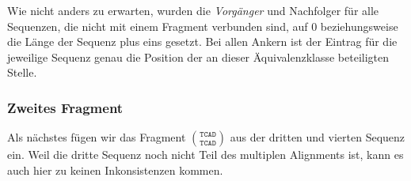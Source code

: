 Wie nicht anders zu erwarten, wurden die \emph{Vorgänger} und Nachfolger für alle Sequenzen, die nicht mit einem Fragment verbunden sind, auf 0 beziehungsweise die Länge der Sequenz plus eins gesetzt. Bei allen Ankern ist der Eintrag für die jeweilige Sequenz genau die Position der an dieser Äquivalenzklasse beteiligten Stelle.

\subsubsection{Zweites Fragment}

Als nächstes fügen wir das Fragment ${\texttt{TCAD}}\choose{\texttt{TCAD}}$ aus der dritten und vierten Sequenz ein. Weil die dritte Sequenz noch nicht Teil des multiplen Alignments ist, kann es auch hier zu keinen Inkonsistenzen kommen.


